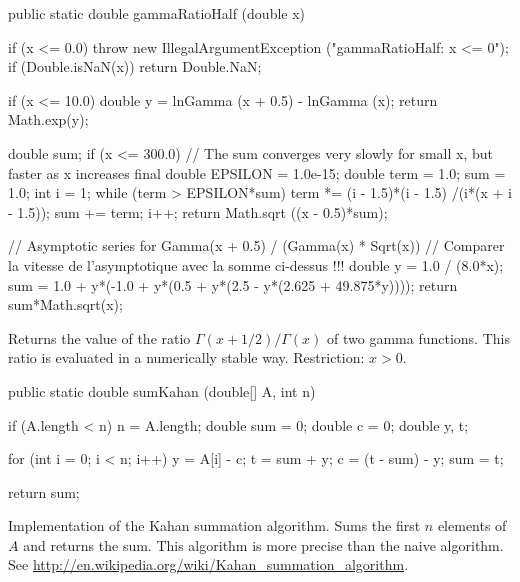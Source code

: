 \begin{code}

   public static double gammaRatioHalf (double x)\begin{hide} {
      if (x <= 0.0)
         throw new IllegalArgumentException ("gammaRatioHalf:   x <= 0");
      if (Double.isNaN(x))
         return Double.NaN;

      if (x <= 10.0) {
         double y = lnGamma (x + 0.5) - lnGamma (x);
         return Math.exp(y);
      }

      double sum;
      if (x <= 300.0) {
         // The sum converges very slowly for small x, but faster as x increases
         final double EPSILON = 1.0e-15;
         double term = 1.0;
         sum = 1.0;
         int i = 1;
         while (term > EPSILON*sum) {
            term *= (i - 1.5)*(i - 1.5) /(i*(x + i - 1.5));
            sum += term;
            i++;
         }
         return Math.sqrt ((x - 0.5)*sum);
      }

      // Asymptotic series for Gamma(x + 0.5) / (Gamma(x) * Sqrt(x))
      // Comparer la vitesse de l'asymptotique avec la somme ci-dessus !!!
      double y = 1.0 / (8.0*x);
      sum = 1.0 + y*(-1.0 + y*(0.5 + y*(2.5 - y*(2.625 + 49.875*y))));
      return sum*Math.sqrt(x);
   }\end{hide}
\end{code}
\begin{tabb}
Returns the value of the ratio $\Gamma(x+1/2)/\Gamma(x)$ of two gamma
functions. This ratio is evaluated in a numerically stable way.
Restriction: $x>0$.
\end{tabb}
\begin{code}

   public static double sumKahan (double[] A, int n) \begin{hide} {
      if (A.length < n)
         n = A.length;
      double sum = 0;
      double c = 0;
      double y, t;

      for (int i = 0; i < n; i++) {
        y = A[i] - c;
        t = sum + y;
        c = (t - sum) - y;
        sum = t;
      }

      return sum;
   }\end{hide}
\end{code}
\begin{tabb}
 Implementation of the Kahan summation algorithm.
Sums the first $n$ elements of $A$ and returns the sum.
This algorithm is more precise than the naive algorithm.
See  \url{http://en.wikipedia.org/wiki/Kahan_summation_algorithm}.
\end{tabb}
